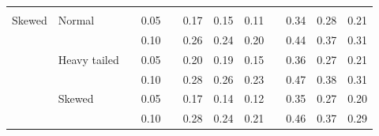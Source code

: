 \documentclass[12pt]{article} %
\begin{document}
\begin{table}[ht]
\begin{scriptsize}
\begin{center}
\begin{tabular}{ll p{.1cm} c p{.1cm} rrr p{.1cm} rrr}
             &&&&&&&&&&&\\
Skewed       & Normal       && 0.05 &&  0.17 & 0.15 & 0.11 && 0.34 & 0.28 & 0.21 \\ 
             &              && 0.10 &&  0.26 & 0.24 & 0.20 && 0.44 & 0.37 & 0.31 \\ 
             & Heavy tailed && 0.05 &&  0.20 & 0.19 & 0.15 && 0.36 & 0.27 & 0.21 \\ 
             &              && 0.10 &&  0.28 & 0.26 & 0.23 && 0.47 & 0.38 & 0.31 \\ 
             & Skewed       && 0.05 &&  0.17 & 0.14 & 0.12 && 0.35 & 0.27 & 0.20 \\ 
             &              && 0.10 &&  0.28 & 0.24 & 0.21 && 0.46 & 0.37 & 0.29 \\

\hline
\end{tabular}
\end{center}
\end{scriptsize}
\end{table}
\end{document}
